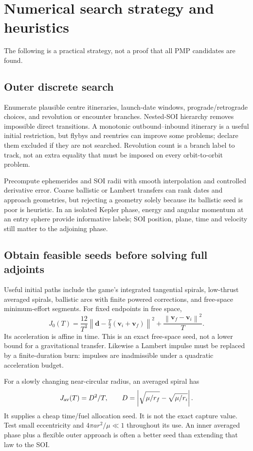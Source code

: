 \documentclass[journal, a4paper]{IEEEtran}
\newcommand{\norm}[1]{\left\lVert#1\right\rVert}
\begin{document}
\section{Numerical search strategy and heuristics}
The following is a practical strategy, not a proof that all PMP candidates are found.

\subsection{Outer discrete search}
Enumerate plausible centre itineraries, launch-date windows, prograde/retrograde choices, and revolution or encounter branches. Nested-SOI hierarchy removes impossible direct transitions. A monotonic outbound--inbound itinerary is a useful initial restriction, but flybys and reentries can improve some problems; declare them excluded if they are not searched. Revolution count is a branch label to track, not an extra equality that must be imposed on every orbit-to-orbit problem.

Precompute ephemerides and SOI radii with smooth interpolation and controlled derivative error. Coarse ballistic or Lambert transfers can rank dates and approach geometries, but rejecting a geometry solely because its ballistic seed is poor is heuristic. In an isolated Kepler phase, energy and angular momentum at an entry sphere provide informative labels; SOI position, plane, time and velocity still matter to the adjoining phase.

\subsection{Obtain feasible seeds before solving full adjoints}
Useful initial paths include the game's integrated tangential spirals, low-thrust averaged spirals, ballistic arcs with finite powered corrections, and free-space minimum-effort segments. For fixed endpoints in free space,
\begin{equation}
 J_0(T)=\frac{12}{T^3}\norm{\mathbf d-\tfrac T2(\mathbf v_i+\mathbf v_f)}^2
       +\frac{\norm{\mathbf v_f-\mathbf v_i}^2}{T}.
\end{equation}
Its acceleration is affine in time. This is an exact free-space seed, not a lower bound for a gravitational transfer. Likewise a Lambert impulse must be replaced by a finite-duration burn: impulses are inadmissible under a quadratic acceleration budget.

For a slowly changing near-circular radius, an averaged spiral has
\begin{equation}
 J_{\rm av}(T)=D^2/T,\qquad
 D=\left|\sqrt{\mu/r_f}-\sqrt{\mu/r_i}\right|.
\end{equation}
It supplies a cheap time/fuel allocation seed. It is not the exact capture value. Test small eccentricity and $4\pi ar^2/\mu\ll1$ throughout its use. An inner averaged phase plus a flexible outer approach is often a better seed than extending that law to the SOI.
\end{document}
